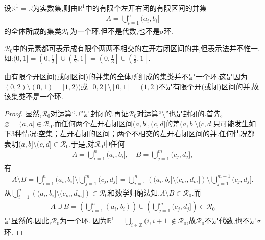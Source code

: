 \documentclass[../../main.tex]{subfiles}%
\begin{document}
\begin{example}\label{example::--23r8u3r89uj2jr3}
设$\mathbb{R}^1 = \mathbb{R}$为实数集,则由$\mathbb{R}^1$中的有限个左开右闭的有限区间的并集
\begin{align*}
A = \bigcup_{i=1}^{n} (a_i, b_i]
\end{align*}
的全体所成的集类$\mathscr{R}_0$为一个环,但不是代数,也不是$\sigma$环.
\end{example}
\begin{remark}
$\mathscr{R}_0$中的元素都可表示成有限个两两不相交的左开右闭区间的并,但表示法并不惟一.如:$(0,1] = \left(0, \frac{1}{2}\right] \cup \left( \frac{1}{2}, 1 \right] = \left(0, \frac{1}{3}\right] \cup \left( \frac{1}{3}, 1 \right].$
\end{remark}
\begin{remark}
由有限个开区间(或闭区间)的并集的全体所组成的集类并不是一个环.这是因为$(0,2) \setminus (0,1) = [1,2)$(或$[0,2] \setminus [0,1] = (1,2]$)不是有限个开(或闭)区间的并,故该集类不是一个环.
\end{remark}
\begin{proof}
显然,$\mathscr{R}_0$对运算“$\cup$”是封闭的.再证$\mathscr{R}_0$对运算“$\setminus$”也是封闭的.首先,$\varnothing = (a, a] \in \mathscr{R}_0$.而任何两个左开右闭区间$(a,b],(c,d]$的差$(a,b] \setminus (c,d]$只可能发生如下3种情况:\one 空集；\two 左开右闭的区间；\three 两个不相交的左开右闭区间的并.任何情况都表明$(a,b] \setminus (c,d] \in \mathscr{R}_0$.于是,对$\mathscr{R}_0$中任何
\begin{align*}
A = \bigcup_{i=1}^{n} (a_i, b_i], \quad B = \bigcup_{j=1}^{m} (c_j, d_j],
\end{align*}
有
\begin{align*}
A \setminus B = \bigcup_{i=1}^{n} (a_i, b_i] \setminus \bigcup_{j=1}^{m} (c_j, d_j] = \bigcup_{i=1}^{n} \left( (a_i, b_i] \setminus (c_m, d_m] \right) \setminus \bigcup_{j=1}^{m-1} (c_j, d_j].
\end{align*}
从$\bigcup_{i=1}^{n} \left( (a_i, b_i] \setminus (c_m, d_m] \right) \in \mathscr{R}_0$和数学归纳法知,$A \setminus B \in \mathscr{R}_0$.而
\begin{align*}
A \cup B = \left( \bigcup_{i=1}^{n} (a_i, b_i) \right) \cup \left( \bigcup_{j=1}^{m} (c_j, d_j] \right) \in \mathscr{R}_0
\end{align*}
是显然的.因此,$\mathscr{R}_0$为一个环.
因为$\mathbb{R}^1 = \bigcup_{i \in \mathbb{Z}} (i, i+1] \notin \mathscr{R}_0$,故$\mathscr{R}_0$不是代数,也不是$\sigma$环.
\end{proof}
\end{document}
